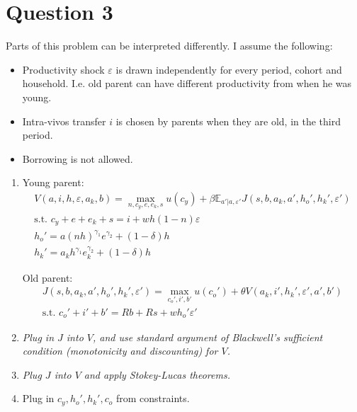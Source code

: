 \documentclass{article}
\newcommand{\E}{\mathbb{E}}
\begin{document}
\section*{Question 3}
  Parts of this problem can be interpreted differently. I assume the following:
  \begin{itemize}
  \item Productivity shock $\varepsilon$ is drawn independently for
    every period, cohort and household. I.e. old parent can have
    different productivity from when he was young.
  \item Intra-vivos transfer $i$ is chosen by parents when they are
    old, in the third period.
  \item Borrowing is not allowed.
  \end{itemize}

\begin{enumerate}
 \item Young parent:
  \begin{gather*}
    V(a,i,h,\varepsilon,a_k,b)=\max_{n,c_y,e,e_k,s}u(c_y)+\beta\E_{a'|a,\varepsilon'}J(s,b,a_k,a',h_o',h_k',\varepsilon')\\
    \text{s.t. } c_y+e+e_k+s=i+wh(1-n)\varepsilon\\
    h_o'=a(nh)^{\gamma_1}e^{\gamma_2}+(1-\delta)h\\
    h_k'=a_kh^{\gamma_1}e_k^{\gamma_2}+(1-\delta)h
  \end{gather*}

Old parent:
\begin{gather*}
  J(s,b,a_k,a',h_o',h_k',\varepsilon')=\max_{c_o',i',b'}u(c_o')+\theta V(a_k,i',h_k',\varepsilon',a',b')\\
  \text{s.t. }c_o'+i'+b'=Rb+Rs+wh_o'\varepsilon'  
\end{gather*}

\item \textit{Plug in $J$ into $V$, and use standard argument of
    Blackwell's sufficient condition (monotonicity and discounting)
    for $V$.}

\item \textit{Plug $J$ into $V$ and apply Stokey-Lucas theorems.}

\item Plug in $c_y,h_o',h_k',c_o$ from constraints.


\end{enumerate}
\end{document}
